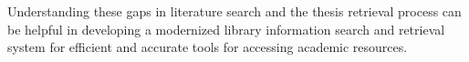 \begin{refsection}
\hspace{0.4cm}Understanding these gaps in literature search and the thesis retrieval process can be helpful in developing a modernized library information search and retrieval system for efficient and accurate tools for accessing academic resources. 


\clearpage

\printbibliography[heading=subbibintoc, title={\centering Notes}]
\end{refsection}
